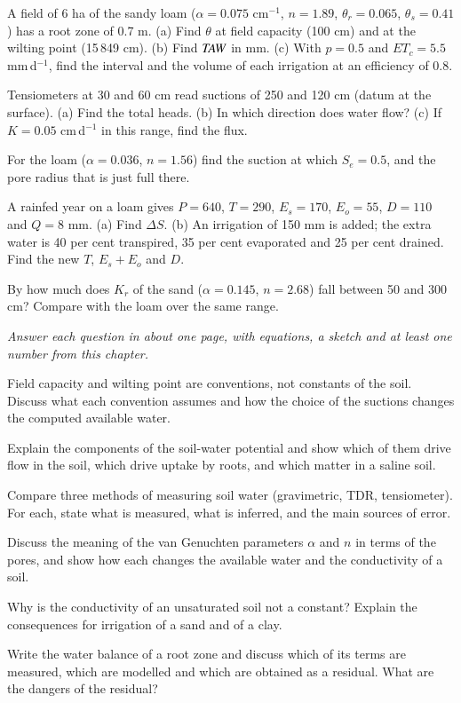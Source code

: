\begin{exlist}
\item A field of 6 ha of the sandy loam ($\alpha=0.075$ cm$^{-1}$, $n=1.89$, $\theta_r=0.065$, $\theta_s=0.41$) has a root zone of 0.7 m. (a) Find $\theta$ at field capacity (100 cm) and at the wilting point (15\,849 cm). (b) Find $\mathit{TAW}$ in mm. (c) With $p=0.5$ and $ET_c=5.5$ mm\,d$^{-1}$, find the interval and the volume of each irrigation at an efficiency of 0.8.
\item Tensiometers at 30 and 60 cm read suctions of 250 and 120 cm (datum at the surface). (a) Find the total heads. (b) In which direction does water flow? (c) If $K=0.05$ cm\,d$^{-1}$ in this range, find the flux.
\item For the loam ($\alpha=0.036$, $n=1.56$) find the suction at which $S_e=0.5$, and the pore radius that is just full there.
\item A rainfed year on a loam gives $P=640$, $T=290$, $E_s=170$, $E_o=55$, $D=110$ and $Q=8$ mm. (a) Find $\Delta S$. (b) An irrigation of 150 mm is added; the extra water is 40 per cent transpired, 35 per cent evaporated and 25 per cent drained. Find the new $T$, $E_s+E_o$ and $D$.
\item By how much does $K_r$ of the sand ($\alpha=0.145$, $n=2.68$) fall between 50 and 300 cm? Compare with the loam over the same range.
\end{exlist}
{\small\itshape Answer each question in about one page, with equations, a sketch and at least one number from this chapter.}\par\vspace{3pt}
\begin{exlist}
\item Field capacity and wilting point are conventions, not constants of the soil. Discuss what each convention assumes and how the choice of the suctions changes the computed available water.
\item Explain the components of the soil-water potential and show which of them drive flow in the soil, which drive uptake by roots, and which matter in a saline soil.
\item Compare three methods of measuring soil water (gravimetric, TDR, tensiometer). For each, state what is measured, what is inferred, and the main sources of error.
\item Discuss the meaning of the van Genuchten parameters $\alpha$ and $n$ in terms of the pores, and show how each changes the available water and the conductivity of a soil.
\item Why is the conductivity of an unsaturated soil not a constant? Explain the consequences for irrigation of a sand and of a clay.
\item Write the water balance of a root zone and discuss which of its terms are measured, which are modelled and which are obtained as a residual. What are the dangers of the residual?
\end{exlist}
